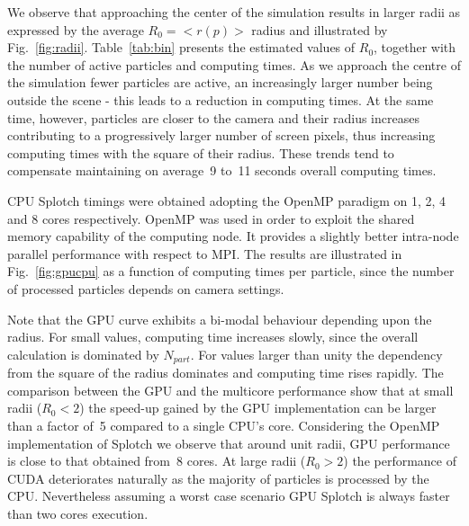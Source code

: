 \documentclass[preprint,5pt]{elsarticle}
\begin{document}
We observe that approaching the center of the simulation results in larger radii 
as expressed by the average $R_0=<r(p)>$ radius and illustrated by Fig.~\ref{fig:radii}. 
Table~\ref{tab:bin} presents the estimated values of $R_0$, together with the number of active particles and computing times. As we approach the centre of the simulation fewer particles are active, an increasingly larger number being outside the scene - this leads to a reduction in computing times. At the same time, however, particles are closer to the camera and their radius increases contributing to a progressively larger number of screen pixels,
thus increasing computing times with the square of their radius. 
These trends tend to compensate maintaining on average~9 to~11 seconds overall computing times.

CPU Splotch timings were obtained adopting the OpenMP paradigm on 1, 2, 4 and 8 cores respectively. OpenMP was used in order to exploit the shared memory capability of the computing node. It provides a slightly better intra-node parallel performance with respect to MPI. The results are illustrated in Fig.~\ref{fig:gpucpu} as a function of computing times per particle, since the number of processed particles depends on camera settings.

Note that the GPU curve exhibits a bi-modal behaviour depending upon the radius. For small values, computing time increases slowly, since the overall calculation is dominated by $N_{part}$. For values larger than unity the dependency from the square of the radius dominates and computing time rises rapidly. The comparison between the GPU and the multicore performance show that at small radii ($R_0 < 2$) the speed-up gained by the GPU implementation can be larger than a factor of~5 compared to a single CPU's core. Considering the OpenMP implementation of Splotch we observe that around unit radii, GPU performance is close to that obtained from~8 cores. At large radii ($R_0 > 2$) the performance of CUDA deteriorates naturally as the majority of particles is processed by the CPU. Nevertheless assuming a worst case scenario GPU Splotch is always faster than two cores execution. 
\end{document}
